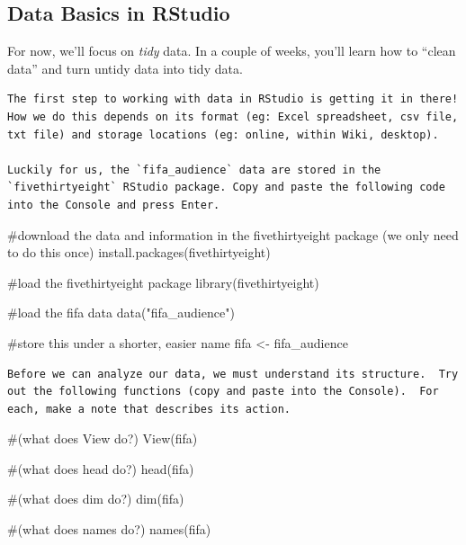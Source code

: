 \documentclass[
  letterpaper,
  DIV=11,
  numbers=noendperiod]{scrreprt}
\newenvironment{Shaded}{\begin{snugshade}}{\end{snugshade}}
\newcommand{\CommentTok}[1]{\textcolor[rgb]{0.37,0.37,0.37}{#1}}
\newcommand{\FunctionTok}[1]{\textcolor[rgb]{0.28,0.35,0.67}{#1}}
\newcommand{\NormalTok}[1]{\textcolor[rgb]{0.00,0.23,0.31}{#1}}
\newcommand{\OtherTok}[1]{\textcolor[rgb]{0.00,0.23,0.31}{#1}}
\newcommand{\StringTok}[1]{\textcolor[rgb]{0.13,0.47,0.30}{#1}}
\begin{document}
\subsection{Data Basics in RStudio}\label{data-basics-in-rstudio}

For now, we'll focus on \emph{tidy} data. In a couple of weeks, you'll
learn how to ``clean data'' and turn untidy data into tidy data.

\begin{verbatim}
The first step to working with data in RStudio is getting it in there!  How we do this depends on its format (eg: Excel spreadsheet, csv file, txt file) and storage locations (eg: online, within Wiki, desktop).  

Luckily for us, the `fifa_audience` data are stored in the `fivethirtyeight` RStudio package. Copy and paste the following code into the Console and press Enter.
\end{verbatim}

\begin{Shaded}
\begin{Highlighting}[]
\CommentTok{\#download the data and information in the fivethirtyeight package (we only need to do this once)}
\FunctionTok{install.packages}\NormalTok{(}\StringTok{\textquotesingle{}fivethirtyeight\textquotesingle{}}\NormalTok{)}

\CommentTok{\#load the fivethirtyeight package}
\FunctionTok{library}\NormalTok{(fivethirtyeight)}
    
\CommentTok{\#load the fifa data}
\FunctionTok{data}\NormalTok{(}\StringTok{"fifa\_audience"}\NormalTok{)}
    
\CommentTok{\#store this under a shorter, easier name}
\NormalTok{fifa }\OtherTok{\textless{}{-}}\NormalTok{ fifa\_audience}
\end{Highlighting}
\end{Shaded}

\begin{verbatim}
Before we can analyze our data, we must understand its structure.  Try out the following functions (copy and paste into the Console).  For each, make a note that describes its action.  
\end{verbatim}

\begin{Shaded}
\begin{Highlighting}[]
\CommentTok{\#(what does View do?)}
\FunctionTok{View}\NormalTok{(fifa)  }

\CommentTok{\#(what does head do?)}
\FunctionTok{head}\NormalTok{(fifa)  }

\CommentTok{\#(what does dim do?)}
\FunctionTok{dim}\NormalTok{(fifa)           }

\CommentTok{\#(what does names do?)}
\FunctionTok{names}\NormalTok{(fifa)         }
\end{Highlighting}
\end{Shaded}
\end{document}
